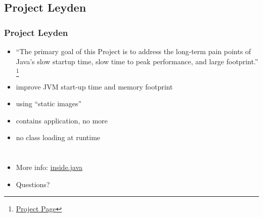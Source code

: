 \documentclass{beamer}
\begin{document}
\subsection{Project Leyden}
\begin{frame}
\frametitle{Project Leyden}
\begin{itemize}
  \item ``The primary goal of this Project is to address the long-term pain points of Java's slow startup time, slow time to peak performance, and large footprint.''
  \footnote{\href{https://openjdk.org/projects/leyden/}{Project Page}}
  \pause
  \item improve JVM start-up time and memory footprint
  \item using ``static images''
  \item contains application, no more
  \item no class loading at runtime
\end{itemize}
\end{frame}


\section{}

\begin{frame}
\frametitle{}
\begin{itemize}
  \item More info: \href{https://inside.java}{inside.java}
  \item Questions?
\end{itemize}
\end{frame}
\end{document}
